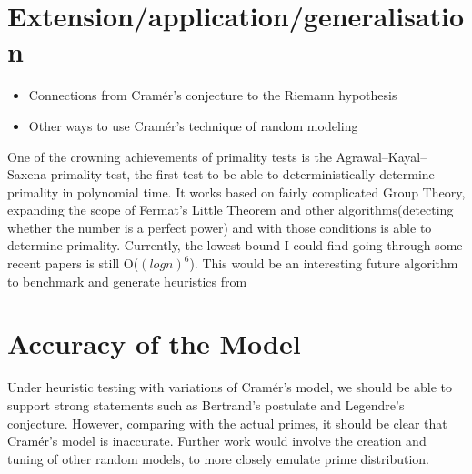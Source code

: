 \documentclass[conference]{IEEEtran}
\begin{document}
\section{Extension/application/generalisation}
\begin{itemize}
    \item Connections from Cram\'er's conjecture to the Riemann hypothesis
    \item Other ways to use Cram\'er's technique of random modeling
\end{itemize}
One of the crowning achievements of primality tests is the Agrawal–Kayal–Saxena primality test, the first test to be able to deterministically determine primality in polynomial time. It works based on fairly complicated Group Theory, expanding the scope of Fermat's Little Theorem and other algorithms(detecting whether the number is a perfect power) and with those conditions is able to determine primality. Currently, the lowest bound I could find going through some recent papers is still O($(log n)^6$). This would be an interesting future algorithm to benchmark and generate heuristics from


\section{Accuracy of the Model}

Under heuristic testing with variations of Cram\'er's model, we should be able to support strong statements such as Bertrand's postulate and Legendre's conjecture. However, comparing with the actual primes, it should be clear that Cram\'er's model is inaccurate. Further work would involve the creation and tuning of other random models, to more closely emulate prime distribution.
\end{document}
